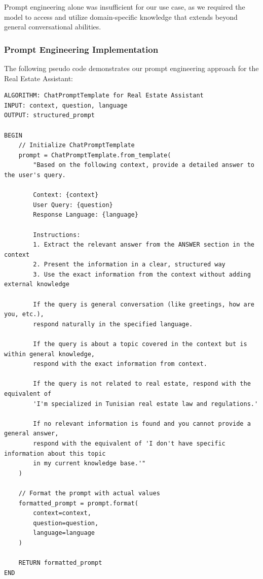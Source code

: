 Prompt engineering alone was insufficient for our use case, as we required the model to access and utilize domain-specific knowledge that extends beyond general conversational abilities.

\subsubsection{Prompt Engineering Implementation}
The following pseudo code demonstrates our prompt engineering approach for the Real Estate Assistant:

\begin{verbatim}
ALGORITHM: ChatPromptTemplate for Real Estate Assistant
INPUT: context, question, language
OUTPUT: structured_prompt

BEGIN
    // Initialize ChatPromptTemplate
    prompt = ChatPromptTemplate.from_template(
        "Based on the following context, provide a detailed answer to the user's query.
        
        Context: {context}
        User Query: {question}
        Response Language: {language}
        
        Instructions:
        1. Extract the relevant answer from the ANSWER section in the context
        2. Present the information in a clear, structured way
        3. Use the exact information from the context without adding external knowledge
        
        If the query is general conversation (like greetings, how are you, etc.), 
        respond naturally in the specified language.
        
        If the query is about a topic covered in the context but is within general knowledge, 
        respond with the exact information from context.
        
        If the query is not related to real estate, respond with the equivalent of 
        'I'm specialized in Tunisian real estate law and regulations.'
        
        If no relevant information is found and you cannot provide a general answer, 
        respond with the equivalent of 'I don't have specific information about this topic 
        in my current knowledge base.'"
    )
    
    // Format the prompt with actual values
    formatted_prompt = prompt.format(
        context=context,
        question=question,
        language=language
    )
    
    RETURN formatted_prompt
END
\end{verbatim}


